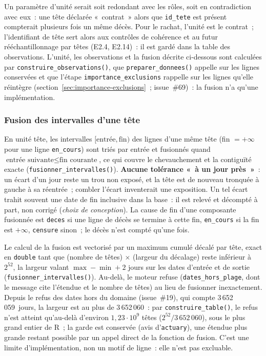 \documentclass[a4paper,11pt]{article}
\newcommand{\code}[1]{\texttt{\small #1}}
\begin{document}
\noindent
Un paramètre d'unité serait soit redondant avec les rôles, soit en
contradiction avec eux~: une tête déclarée «~contrat~» alors que
\code{id\_tete} est présent compterait plusieurs fois un même décès. Pour le
rachat, l'unité est le contrat~; l'identifiant de tête sert alors aux contrôles
de cohérence et au futur rééchantillonnage par têtes (E2.4, E2.14)~: il est
gardé dans la table des observations. L'unité, les observations et la fusion
décrite ci-dessous sont calculées par \code{construire\_observations()}, que
\code{preparer\_donnees()} appelle sur les lignes conservées et que l'étape
\code{importance\_exclusions} rappelle sur les lignes qu'elle réintègre
(section~\ref{sec:importance-exclusions}~; issue~\#69)~: la fusion n'a
qu'une implémentation.

\subsubsection*{Fusion des intervalles d'une tête}

En unité tête, les intervalles $[\text{entrée}, \text{fin})$ des lignes d'une
même tête (fin $= +\infty$ pour une ligne \code{en\_cours}) sont triés par
entrée et fusionnés quand $\text{entrée suivante} \le \text{fin courante}$, ce
qui couvre le chevauchement et la contiguïté exacte
(\code{fusionner\_intervalles()}). \textbf{Aucune tolérance «~à un jour
près~»}~: un écart d'un jour reste un trou non exposé, et la tête est de
nouveau tronquée à gauche à sa réentrée~; combler l'écart inventerait une
exposition. Un tel écart trahit souvent une date de fin inclusive dans la
base~: il est relevé et décompté à part, non corrigé (\emph{choix de
conception}). La cause de fin d'une composante fusionnée est \code{deces} si
une ligne de décès se termine à cette fin, \code{en\_cours} si la fin est
$+\infty$, \code{censure} sinon~; le décès n'est compté qu'une fois.

\medskip
Le calcul de la fusion est vectorisé par un maximum cumulé décalé par tête,
exact en \code{double} tant que (nombre de têtes) $\times$ (largeur du
décalage) reste inférieur à $2^{52}$, la largeur valant
$\max - \min + 2$ jours sur les dates d'entrée et de sortie
(\code{fusionner\_intervalles()}). Au-delà, le moteur refuse
(\code{dates\_hors\_plage}, dont le message cite l'étendue et le nombre de
têtes) au lieu de fusionner inexactement. Depuis le refus des dates hors du
domaine (issue~\#19), qui compte 3\,652\,059~jours, la largeur est au plus
de 3\,652\,060~: par
\code{construire\_table()}, le refus n'est atteint qu'au-delà d'environ
$1{,}23\cdot 10^{9}$ têtes ($2^{52}/3\,652\,060$), sous le plus grand
entier de R~; la garde est conservée (avis d'\code{actuary}), une étendue
plus grande restant possible par un appel direct de la fonction de fusion.
C'est une limite d'implémentation, non un motif de ligne~: elle n'est pas
excluable.
\end{document}
